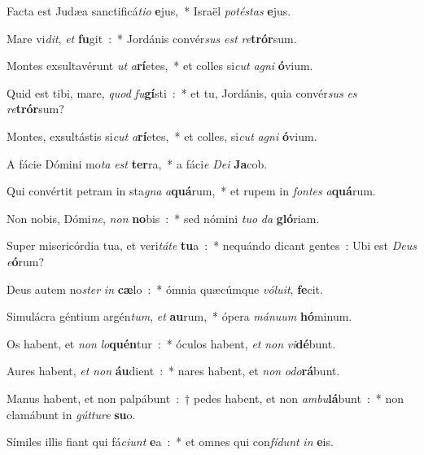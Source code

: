 ﻿\item Facta est Judæa sanctificá\emph{ti}\-\emph{o} \textbf{e}\-jus,~* Israël \emph{po}\-\emph{té}\-\emph{stas} \textbf{e}\-jus.
\item Mare vi\emph{dit}, \emph{et} \textbf{fu}\-git~:~* Jordánis convér\emph{sus} \emph{est} \emph{re}\-\textbf{trór}\-sum.
\item Montes exsultavérunt \emph{ut} \emph{a}\-\textbf{rí}\-etes,~* et colles si\emph{cut} \emph{a}\-\emph{gni} \textbf{ó}\-vi\-um.
\item Quid est tibi, mare, \emph{quod} \emph{fu}\-\textbf{gí}\-sti~:~* et tu, Jordánis, quia convér\emph{sus} \emph{es} \emph{re}\-\textbf{trór}\-sum?
\item Montes, exsultástis si\emph{cut} \emph{a}\-\textbf{rí}\-etes,~* et colles, si\emph{cut} \emph{a}\-\emph{gni} \textbf{ó}\-vi\-um.
\item A fácie Dómini mo\emph{ta} \emph{est} \textbf{ter}\-ra,~* a fáci\emph{e} \emph{De}\-\emph{i} \textbf{Ja}\-cob.
\item Qui convértit petram in sta\emph{gna} \emph{a}\-\textbf{quá}\-rum,~* et rupem in \emph{fon}\-\emph{tes} \emph{a}\-\textbf{quá}\-rum.
\item Non nobis, Dómi\emph{ne}, \emph{non} \textbf{no}\-bis~:~* sed nómini \emph{tu}\-\emph{o} \emph{da} \textbf{gló}\-riam.
\item Super misericórdia tua, et veri\emph{tá}\-\emph{te} \textbf{tu}\-a~:~* nequándo dicant gentes~: Ubi est \emph{De}\-\emph{us} \emph{e}\-\textbf{ó}\-rum?
\item Deus autem no\emph{ster} \emph{in} \textbf{cæ}\-lo~:~* ómnia quæcúmque \emph{vó}\-\emph{lu}\-\emph{it}, \textbf{fe}\-cit.
\item Simulácra géntium argén\emph{tum}, \emph{et} \textbf{au}\-rum,~* ópera \emph{má}\-\emph{nu}\-\emph{um} \textbf{hó}\-minum.
\item Os habent, et \emph{non} \emph{lo}\-\textbf{quén}\-tur~:~* óculos habent, \emph{et} \emph{non} \emph{vi}\-\textbf{dé}\-bunt.
\item Aures habent, \emph{et} \emph{non} \textbf{áu}\-dient~:~* nares habent, et \emph{non} \emph{o}\-\emph{do}\-\textbf{rá}\-bunt.
\item Manus habent, et non palpábunt~:~† pedes habent, et non \emph{am}\-\emph{bu}\-\textbf{lá}\-bunt~:~* non clamábunt in \emph{gút}\-\emph{tu}\-\emph{re} \textbf{su}\-o.
\item Símiles illis fiant qui fá\emph{ci}\-\emph{unt} \textbf{e}\-a~:~* et omnes qui con\-\emph{fí}\-\emph{dunt} \emph{in} \textbf{e}\-is.
